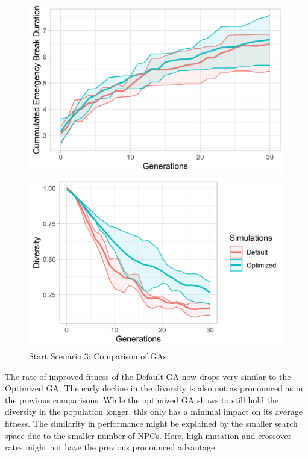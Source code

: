\begin{figure}[ht] 
	\label{fig:evaluation:sim_3_ga_comparison}
	\begin{minipage}[b]{0.5\linewidth}
		\centering
		\includegraphics[width=1\linewidth]{simulations/evaluation/plots/sim_3_ga_generations} 
	\end{minipage}%
	\begin{minipage}[b]{0.5\linewidth}
		\centering
		\includegraphics[width=1\linewidth]{simulations/evaluation/plots/sim_3_ga_diversity} 
	\end{minipage} 
	\caption{Start Scenario 3: Comparison of GAs}
\end{figure}


The rate of improved fitness of the Default GA now drops very similar to the Optimized GA. The early decline in the diversity is also not as pronounced as in the previous comparisons. While the optimized GA shows to still hold the diversity in the population longer, this only has a minimal impact on its average fitness. The similarity in performance might be explained by the smaller search space due to the smaller number of NPCs. Here, high mutation and crossover rates might not have the previous pronounced advantage.

